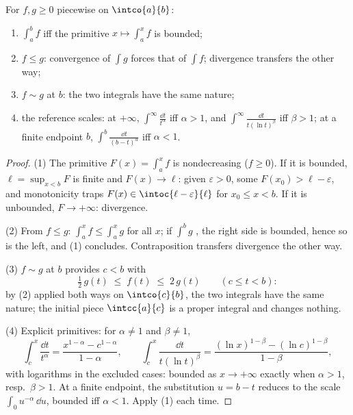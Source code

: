 \begin{theorem}\label{thm:b2:integration:comparison}
For $f, g \geq 0$ piecewise  on $\intco{a}{b}$:
\begin{enumerate}
  \item $\int_a^b f$  iff the primitive $x \mapsto \int_a^x
        f$ is bounded;
  \item $f \leq g$: convergence of $\int g$ forces that of $\int f$;
        divergence transfers the other way;
  \item $f \sim g$ at $b$: the two integrals have the same nature;
  \item the reference scales: at $+\infty$, $\int^{\infty}
        \frac{\dd t}{t^\alpha}$  iff $\alpha > 1$, and
        $\int^\infty \frac{\dd t}{t(\ln t)^\beta}$ iff $\beta > 1$;
        at a finite endpoint $b$, $\int^b \frac{\dd t}{(b -
        t)^\alpha}$  iff $\alpha < 1$.
\end{enumerate}
\end{theorem}

\begin{proof}
(1) The primitive $F(x) = \int_a^x f$ is nondecreasing ($f \geq
0$). If it is bounded, $\ell = \sup_{x < b}F$ is finite and
$F(x) \to \ell$: given $\varepsilon > 0$, some $F(x_0) > \ell -
\varepsilon$, and monotonicity traps $F(x) \in
\intoc{\ell - \varepsilon}{\ell}$ for $x_0 \leq x < b$. If it is
unbounded, $F \to +\infty$: divergence.

(2) From $f \leq g$: $\int_a^x f \leq \int_a^x g$ for all $x$;
if $\int^b g$ , the right side is bounded, hence so is
the left, and (1) concludes. Contraposition transfers divergence
the other way.

(3) $f \sim g$ at $b$ provides $c < b$ with
\[
\tfrac12\,g(t) \;\leq\; f(t) \;\leq\; 2\,g(t)
\qquad (c \leq t < b) :
\]
by (2) applied both ways on $\intco{c}{b}$, the two integrals
have the same nature; the initial piece $\intcc{a}{c}$ is a
proper integral and changes nothing.

(4) Explicit primitives: for $\alpha \neq 1$ and $\beta \neq 1$,
\[
\int_c^x \frac{\dd t}{t^\alpha}
= \frac{x^{1-\alpha} - c^{1-\alpha}}{1 - \alpha},
\qquad
\int_c^x \frac{\dd t}{t(\ln t)^\beta}
= \frac{(\ln x)^{1-\beta} - (\ln c)^{1-\beta}}{1 - \beta},
\]
with logarithms in the excluded cases: bounded as $x \to
+\infty$ exactly when $\alpha > 1$, resp.\ $\beta > 1$. At a
finite endpoint, the substitution $u = b - t$ reduces to the
scale $\int_0 u^{-\alpha}\,\dd u$, bounded iff $\alpha < 1$.
Apply (1) each time.
\end{proof}

